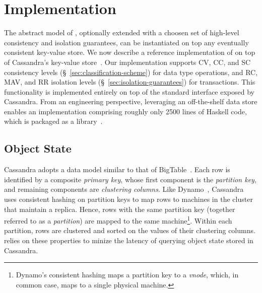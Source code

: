 \section{Implementation}
\label{sec:implementation}

The abstract model of \name, optionally extended with a choosen set of
high-level consistency and isolation guarantees, can be instantiated
on top any eventually consistent key-value store. We now describe a
reference implementation of \name on top of Cassandra's key-value
store~\cite{Cassandra}. Our implementation supports CV, CC, and SC
consistency levels (\S~\ref{sec:classification-scheme}) for data type
operations, and RC, MAV, and RR isolation levels
(\S~\ref{sec:isolation-guarantees}) for transactions. This
functionality is implemented entirely on top of the standard interface
exposed by Cassandra. From an engineering perspective, leveraging an
off-the-shelf data store enables an implementation comprising roughly
only 2500 lines of Haskell code, which is packaged as a
library~\cite{QueleaHackage}.

\subsection{Object State}


Cassandra adopts a data model similar to that of
BigTable~\cite{BigTable}. Each row is identified by a composite
\emph{primary key}, whose first component is the \emph{partition key},
and remaining components are \emph{clustering columns}. Like
Dynamo~\cite{Dynamo}, Cassandra uses consistent hashing on partition
keys to map rows to machines in the cluster that maintain a replica.
Hence, rows with the same partition key (together referred to as a
\emph{partition}) are mapped to the same machine\footnote{Dynamo's
consistent hashing maps a partition key to a \emph{vnode}, which, in
common case, maps to a single physical machine.}. Within each
partition, rows are clustered and sorted on the values of their
clustering columns. \name relies on these properties to minize the
latency of querying object state stored in Cassandra.

